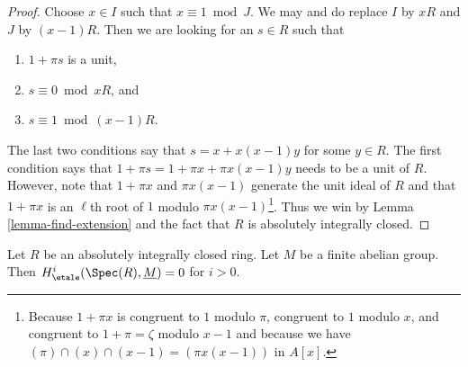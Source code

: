 \begin{proof}
Choose $x \in I$ such that $x \equiv 1 \bmod J$.
We may and do replace $I$ by $xR$ and $J$ by $(x - 1)R$.
Then we are looking for an $s \in R$ such that
\begin{enumerate}
\item $1 + \pi s$ is a unit,
\item $s \equiv 0 \bmod xR$, and
\item $s \equiv 1 \bmod (x - 1)R$.
\end{enumerate}
The last two conditions say that $s = x + x(x - 1)y$ for some $y \in R$.
The first condition says that $1 + \pi s = 1 + \pi x + \pi x (x - 1) y$
needs to be a unit of $R$.
However, note that $1 + \pi x$ and $\pi x (x - 1)$ generate the
unit ideal of $R$ and that $1 + \pi x$ is an $\ell$th root of $1$
modulo $\pi x (x - 1)$\footnote{Because $1 + \pi x$ is congruent
to $1$ modulo $\pi$, congruent to $1$ modulo $x$, and congruent to
$1 + \pi = \zeta$ modulo $x - 1$ and because we have
$(\pi) \cap (x) \cap (x - 1) = (\pi x (x - 1))$ in $A[x]$.}.
Thus we win by Lemma \ref{lemma-find-extension} and the
fact that $R$ is absolutely integrally closed.
\end{proof}

\begin{proposition}
\label{proposition-aic-vanishing}
Let $R$ be an absolutely integrally closed ring.
Let $M$ be a finite abelian group.
Then $H^i_\etale(\Spec(R), \underline{M}) = 0$ for $i > 0$.
\end{proposition}

